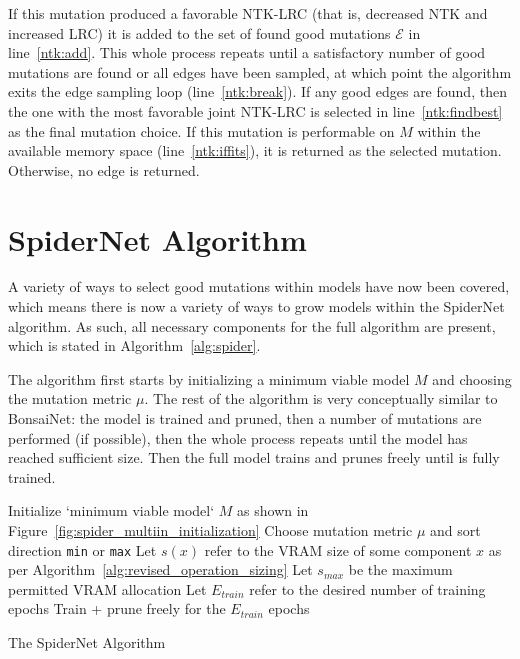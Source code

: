 If this mutation produced a favorable NTK-LRC (that is, decreased NTK and increased LRC) it is added to the set of
found good mutations $\mathcal{E}$ in line~\ref{ntk:add}. This whole process repeats until a satisfactory number of good mutations
are found or all edges have been sampled, at which point the algorithm exits the edge sampling loop (line~\ref{ntk:break}).
If any good edges are found, then the one with the most favorable joint NTK-LRC is selected in line~\ref{ntk:findbest}
as the final mutation choice. If this mutation is performable on $M$ within the available memory space
(line~\ref{ntk:iffits}), it is returned as the selected mutation. Otherwise, no edge is returned.


\section{SpiderNet Algorithm}\label{sect:spider_alg}
A variety of ways to select good mutations within models have now been covered, which means there is now a variety of ways to
grow models within the SpiderNet algorithm. As such, all necessary components for the full algorithm are present, which is
stated in Algorithm~\ref{alg:spider}.

The algorithm first starts by initializing a minimum viable model $M$ and choosing the mutation metric $\mu$. The rest
of the algorithm is very conceptually similar to BonsaiNet: the model is trained and pruned, then a number of mutations
are performed (if possible), then the whole process repeats until the model has reached sufficient size. Then the full model
trains and prunes freely until is fully trained.

\begin{algorithm}[ht]
\SetAlgoLined
Initialize `minimum viable model` $M$ as shown in Figure~\ref{fig:spider_multiin_initialization}\;
 Choose mutation metric $\mu$ and sort direction \texttt{min} or \texttt{max}\;
Let $s(x)$ refer to the VRAM size of some component $x$ as per Algorithm~\ref{alg:revised_operation_sizing}\;
Let $s_{max}$ be the maximum permitted VRAM allocation\;
Let $E_{train}$ refer to the desired number of training epochs\;
\BlankLine
{}
 Train + prune freely for the $E_{train}$ epochs\;
\caption{The SpiderNet Algorithm}
\label{alg:spider}
\end{algorithm}


